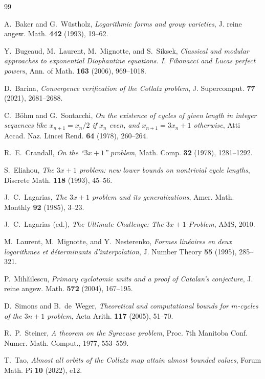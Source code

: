 \documentclass[11pt, a4paper]{amsart}
\theoremstyle{plain}
\theoremstyle{definition}
\theoremstyle{remark}
\begin{document}
\begin{thebibliography}{99}

A.~Baker and G.~W\"ustholz,
\emph{Logarithmic forms and group varieties},
J. reine angew. Math. \textbf{442} (1993), 19--62.

Y.~Bugeaud, M.~Laurent, M.~Mignotte, and S.~Siksek,
\emph{Classical and modular approaches to exponential
Diophantine equations. I. Fibonacci and Lucas perfect powers},
Ann. of Math. \textbf{163} (2006), 969--1018.

D.~Barina,
\emph{Convergence verification of the Collatz problem},
J. Supercomput. \textbf{77} (2021), 2681--2688.

C.~B\"ohm and G.~Sontacchi,
\emph{On the existence of cycles of given length in integer
sequences like $x_{n+1} = x_n/2$ if $x_n$ even, and
$x_{n+1} = 3x_n + 1$ otherwise},
Atti Accad. Naz. Lincei Rend. \textbf{64} (1978), 260--264.

R.~E.~Crandall,
\emph{On the ``$3x + 1$'' problem},
Math. Comp. \textbf{32} (1978), 1281--1292.

S.~Eliahou,
\emph{The $3x + 1$ problem: new lower bounds on nontrivial
cycle lengths},
Discrete Math. \textbf{118} (1993), 45--56.

J.~C.~Lagarias,
\emph{The $3x + 1$ problem and its generalizations},
Amer. Math. Monthly \textbf{92} (1985), 3--23.

J.~C.~Lagarias (ed.),
\emph{The Ultimate Challenge: The $3x + 1$ Problem},
AMS, 2010.

M.~Laurent, M.~Mignotte, and Y.~Nesterenko,
\emph{Formes lin\'eaires en deux logarithmes et d\'eterminants
d'interpolation},
J. Number Theory \textbf{55} (1995), 285--321.

P.~Mih\u{a}ilescu,
\emph{Primary cyclotomic units and a proof of Catalan's
conjecture},
J. reine angew. Math. \textbf{572} (2004), 167--195.

D.~Simons and B.~de~Weger,
\emph{Theoretical and computational bounds for $m$-cycles of
the $3n + 1$ problem},
Acta Arith. \textbf{117} (2005), 51--70.

R.~P.~Steiner,
\emph{A theorem on the Syracuse problem},
Proc. 7th Manitoba Conf. Numer. Math. Comput.,
1977, 553--559.

T.~Tao,
\emph{Almost all orbits of the Collatz map attain almost bounded
values},
Forum Math. Pi \textbf{10} (2022), e12.

\end{thebibliography}
\end{document}
